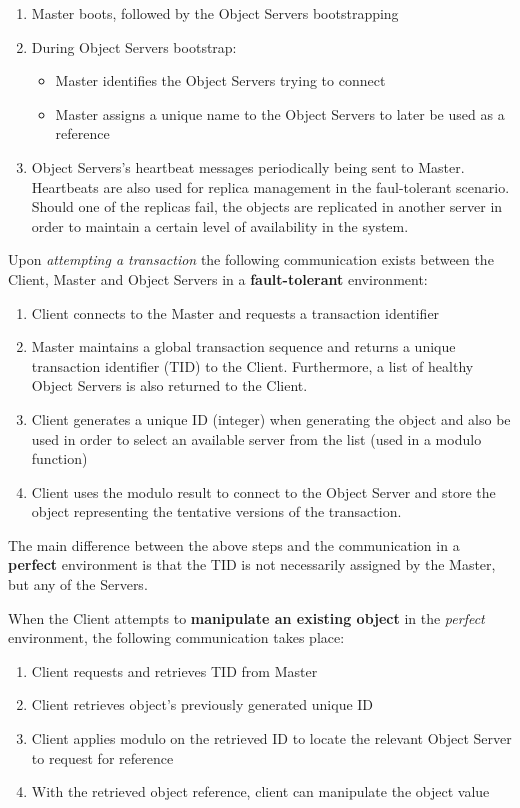 \documentclass[times, 10pt,twocolumn]{article}
\begin{document}
\begin{enumerate}
\item Master boots, followed by the Object Servers bootstrapping
\item During Object Servers bootstrap:
\begin{itemize}[noitemsep, nolistsep]
\item Master identifies the Object Servers trying to connect
\item Master assigns a unique name to the Object Servers to later be used as a reference
\end{itemize}
\item Object Servers's heartbeat messages periodically being sent to Master. Heartbeats are also used for replica management in the faul-tolerant scenario. Should one of the replicas fail, the objects are replicated in another server in order to maintain a certain level of availability in the system.
\end{enumerate}

Upon {\it attempting a transaction} the following communication exists between the Client, Master and Object Servers in a {\bf fault-tolerant} environment: 
\begin{enumerate}
\item Client connects to the Master and requests a transaction identifier 
\item Master maintains a global transaction sequence and returns a unique transaction identifier (TID) to the Client. Furthermore, a list of healthy Object Servers is also returned to the Client. 
\item Client generates a unique ID (integer) when generating the object and also be used in order to select an available server from the list (used in a modulo function)
\item Client uses the modulo result to connect to the Object Server and store the object representing the tentative versions of the transaction.
\end{enumerate}

The main difference between the above steps and the communication in a {\bf perfect} environment is that the TID is not necessarily assigned by the Master, but any of the Servers.

When the Client attempts to {\bf manipulate an existing object} in the {\it perfect} environment, the following communication takes place:
\begin{enumerate}
\item Client requests and retrieves TID from Master
\item Client retrieves object's previously generated unique ID
\item Client applies modulo on the retrieved ID to locate the relevant Object Server to request for reference
\item With the retrieved object reference, client can manipulate the object value
\end{enumerate}
\end{document}
